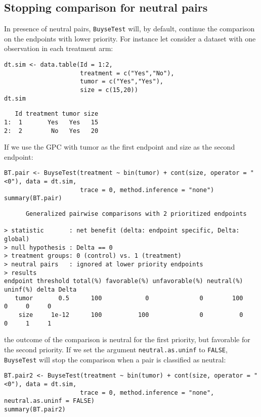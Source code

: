 \documentclass[12pt]{article}
\begin{document}
\subsection{Stopping comparison for neutral pairs}
\label{sec:orgaacefa5}
In presence of neutral pairs, \texttt{BuyseTest} will, by default, continue
the comparison on the endpoints with lower priority. For instance let
consider a dataset with one observation in each treatment arm:
\lstset{language=r,label= ,caption= ,captionpos=b,numbers=none}
\begin{lstlisting}
dt.sim <- data.table(Id = 1:2,
					 treatment = c("Yes","No"),
					 tumor = c("Yes","Yes"),
					 size = c(15,20))
dt.sim
\end{lstlisting}

\begin{verbatim}
   Id treatment tumor size
1:  1       Yes   Yes   15
2:  2        No   Yes   20
\end{verbatim}

\clearpage

If we use the GPC with tumor as the first endpoint and size as the
second endpoint:
\lstset{language=r,label= ,caption= ,captionpos=b,numbers=none}
\begin{lstlisting}
BT.pair <- BuyseTest(treatment ~ bin(tumor) + cont(size, operator = "<0"), data = dt.sim,
					 trace = 0, method.inference = "none")
summary(BT.pair)
\end{lstlisting}

\begin{verbatim}
      Generalized pairwise comparisons with 2 prioritized endpoints

> statistic       : net benefit (delta: endpoint specific, Delta: global) 
> null hypothesis : Delta == 0 
> treatment groups: 0 (control) vs. 1 (treatment) 
> neutral pairs   : ignored at lower priority endpoints
> results
endpoint threshold total(%) favorable(%) unfavorable(%) neutral(%) uninf(%) delta Delta
   tumor       0.5      100            0              0        100        0     0     0
    size     1e-12      100          100              0          0        0     1     1
\end{verbatim}

the outcome of the comparison is neutral for the first priority, but
favorable for the second priority. If we set the argument
\texttt{neutral.as.uninf} to \texttt{FALSE}, \texttt{BuyseTest} will stop the comparison
when a pair is classified as neutral:
\lstset{language=r,label= ,caption= ,captionpos=b,numbers=none}
\begin{lstlisting}
BT.pair2 <- BuyseTest(treatment ~ bin(tumor) + cont(size, operator = "<0"), data = dt.sim,
					 trace = 0, method.inference = "none", neutral.as.uninf = FALSE)
summary(BT.pair2)
\end{lstlisting}
\end{document}
